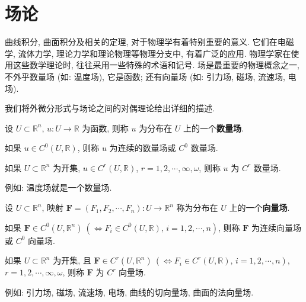 
\section{场论}

曲线积分, 曲面积分及相关的定理, 对于物理学有着特别重要的意义. 它们在电磁学, 流体力学, 理论力学和理论物理等物理分支中, 有着广泛的应用. 物理学家在使用这些数学理论时, 往往采用一些特殊的术语和记号. 场是最重要的物理概念之一, 不外乎数量场 (如: 温度场), 它是函数; 还有向量场 (如: 引力场, 磁场, 流速场, 电场).

我们将外微分形式与场论之间的对偶理论给出详细的描述.

\begin{definition}\label{def:11.6.1}
设 $U\subset\mathbb{R}^{n}$, $u:U\to\mathbb{R}$ 为函数, 则称 $u$ 为分布在 $U$ 上的一个\textbf{数量场}.

如果 $u\in C^{0}(U,\mathbb{R})$, 则称 $u$ 为连续的数量场或 $C^{0}$ 数量场.

如果 $U\subset\mathbb{R}^{n}$ 为开集, $u\in C^{r}(U,\mathbb{R})$, $r=1,2,\cdots,\infty,\omega$, 则称 $u$ 为 $C^{r}$ 数量场.

例如: 温度场就是一个数量场.
\end{definition}

\begin{definition}\label{def:11.6.2}
设 $U\subset\mathbb{R}^{n}$, 映射 $\boldsymbol{F}=(F_{1},F_{2},\cdots,F_{n}):U\to\mathbb{R}^{n}$ 称为分布在 $U$ 上的一个\textbf{向量场}.

如果 $\boldsymbol{F}\in C^{0}(U,\mathbb{R}^{n})\ (\Leftrightarrow F_{i}\in C^{0}(U,\mathbb{R}),\,i=1,2,\cdots,n)$, 则称 $\boldsymbol{F}$ 为连续向量场或 $C^{0}$ 向量场.

如果 $U\subset\mathbb{R}^{n}$ 为开集, 且 $\boldsymbol{F}\in C^{r}(U,\mathbb{R}^{n})\ (\Leftrightarrow F_{i}\in C^{r}(U,\mathbb{R}),\,i=1,2,\cdots,n)$, $r=1,2,\cdots,\infty,\omega$, 则称 $\boldsymbol{F}$ 为 $C^{r}$ 向量场.

例如: 引力场, 磁场, 流速场, 电场, 曲线的切向量场, 曲面的法向量场.
\end{definition}

